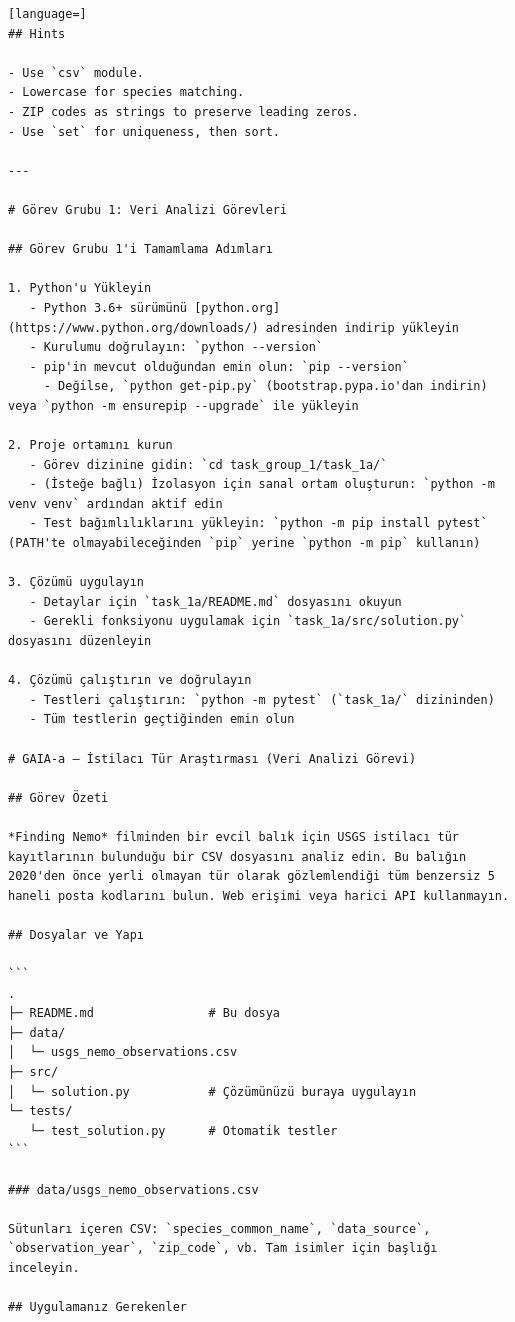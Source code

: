\begin{appendices}
\begin{lstlisting}[language=]
## Hints

- Use `csv` module.
- Lowercase for species matching.
- ZIP codes as strings to preserve leading zeros.
- Use `set` for uniqueness, then sort.

---

# Görev Grubu 1: Veri Analizi Görevleri

## Görev Grubu 1'i Tamamlama Adımları

1. Python'u Yükleyin
   - Python 3.6+ sürümünü [python.org](https://www.python.org/downloads/) adresinden indirip yükleyin
   - Kurulumu doğrulayın: `python --version`
   - pip'in mevcut olduğundan emin olun: `pip --version`
     - Değilse, `python get-pip.py` (bootstrap.pypa.io'dan indirin) veya `python -m ensurepip --upgrade` ile yükleyin

2. Proje ortamını kurun
   - Görev dizinine gidin: `cd task_group_1/task_1a/`
   - (İsteğe bağlı) İzolasyon için sanal ortam oluşturun: `python -m venv venv` ardından aktif edin
   - Test bağımlılıklarını yükleyin: `python -m pip install pytest` (PATH'te olmayabileceğinden `pip` yerine `python -m pip` kullanın)

3. Çözümü uygulayın
   - Detaylar için `task_1a/README.md` dosyasını okuyun
   - Gerekli fonksiyonu uygulamak için `task_1a/src/solution.py` dosyasını düzenleyin

4. Çözümü çalıştırın ve doğrulayın
   - Testleri çalıştırın: `python -m pytest` (`task_1a/` dizininden)
   - Tüm testlerin geçtiğinden emin olun

# GAIA-a – İstilacı Tür Araştırması (Veri Analizi Görevi)

## Görev Özeti

*Finding Nemo* filminden bir evcil balık için USGS istilacı tür kayıtlarının bulunduğu bir CSV dosyasını analiz edin. Bu balığın 2020'den önce yerli olmayan tür olarak gözlemlendiği tüm benzersiz 5 haneli posta kodlarını bulun. Web erişimi veya harici API kullanmayın.

## Dosyalar ve Yapı

```
.
├─ README.md                # Bu dosya
├─ data/
│  └─ usgs_nemo_observations.csv
├─ src/
│  └─ solution.py           # Çözümünüzü buraya uygulayın
└─ tests/
   └─ test_solution.py      # Otomatik testler
```

### data/usgs_nemo_observations.csv

Sütunları içeren CSV: `species_common_name`, `data_source`, `observation_year`, `zip_code`, vb. Tam isimler için başlığı inceleyin.

## Uygulamanız Gerekenler


\end{lstlisting}
\end{appendices}
